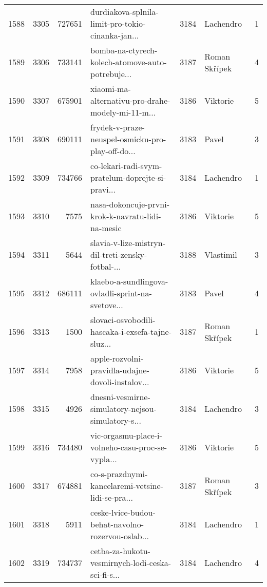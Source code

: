 \begin{tabular}{lrrlrlr}
1588 &       3305 &   727651 &  durdiakova-splnila-limit-pro-tokio-cinanka-jan... &     3184 &                    Lachendro &               1 \\
1589 &       3306 &   733141 &  bomba-na-ctyrech-kolech-atomove-auto-potrebuje... &     3187 &                Roman Skřípek &               4 \\
1590 &       3307 &   675901 &  xiaomi-ma-alternativu-pro-drahe-modely-mi-11-m... &     3186 &                     Viktorie &               5 \\
1591 &       3308 &   690111 &  frydek-v-praze-neuspel-osmicku-pro-play-off-do... &     3183 &                        Pavel &               3 \\
1592 &       3309 &   734766 &  co-lekari-radi-svym-pratelum-doprejte-si-pravi... &     3184 &                    Lachendro &               1 \\
1593 &       3310 &     7575 &  nasa-dokoncuje-prvni-krok-k-navratu-lidi-na-mesic &     3186 &                     Viktorie &               5 \\
1594 &       3311 &     5644 &  slavia-v-lize-mistryn-dil-treti-zensky-fotbal-... &     3188 &                    Vlastimil &               3 \\
1595 &       3312 &   686111 &  klaebo-a-sundlingova-ovladli-sprint-na-svetove... &     3183 &                        Pavel &               4 \\
1596 &       3313 &     1500 &  slovaci-osvobodili-hascaka-i-exsefa-tajne-sluz... &     3187 &                Roman Skřípek &               1 \\
1597 &       3314 &     7958 &  apple-rozvolni-pravidla-udajne-dovoli-instalov... &     3186 &                     Viktorie &               5 \\
1598 &       3315 &     4926 &  dnesni-vesmirne-simulatory-nejsou-simulatory-s... &     3184 &                    Lachendro &               3 \\
1599 &       3316 &   734480 &  vic-orgasmu-place-i-volneho-casu-proc-se-vypla... &     3186 &                     Viktorie &               5 \\
1600 &       3317 &   674881 &  co-s-prazdnymi-kancelaremi-vetsine-lidi-se-pra... &     3187 &                Roman Skřípek &               3 \\
1601 &       3318 &     5911 &  ceske-lvice-budou-behat-navolno-rozervou-oslab... &     3184 &                    Lachendro &               1 \\
1602 &       3319 &   734737 &  cetba-za-hukotu-vesmirnych-lodi-ceska-sci-fi-s... &     3184 &                    Lachendro &               4 \\

\end{tabular}
